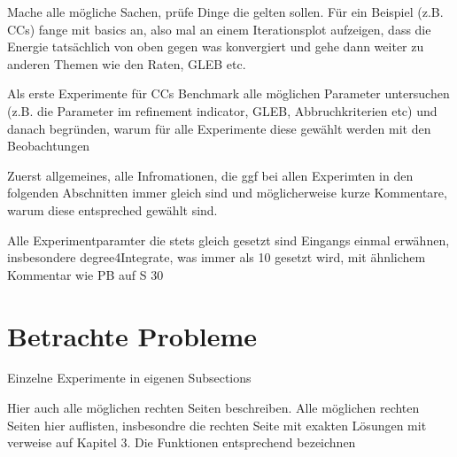 Mache alle mögliche Sachen, prüfe Dinge die gelten sollen. Für ein
Beispiel (z.B. CCs) fange mit basics an, also mal an einem Iterationsplot
aufzeigen, dass die Energie tatsächlich von oben gegen was konvergiert und 
gehe dann weiter zu anderen Themen wie den Raten, GLEB etc.




\bigskip
Als erste Experimente für CCs Benchmark alle möglichen Parameter untersuchen 
(z.B. die Parameter im refinement indicator, GLEB, Abbruchkriterien etc)
und danach begründen, warum für alle Experimente diese gewählt werden mit
den Beobachtungen

\bigskip


Zuerst allgemeines, alle Infromationen, die ggf bei allen Experimten in den 
folgenden Abschnitten immer gleich sind und möglicherweise kurze Kommentare,
warum diese entspreched gewählt sind.

\bigskip

Alle Experimentparamter die stets gleich gesetzt sind Eingangs einmal erwähnen,
insbesondere degree4Integrate, was immer als 10 gesetzt wird, mit ähnlichem 
Kommentar wie PB auf S 30

\section{Betrachte Probleme}
Einzelne Experimente in eigenen Subsections
\bigskip

Hier auch alle möglichen rechten Seiten beschreiben.
Alle möglichen rechten Seiten hier auflisten, insbesondre die rechten 
Seite mit exakten Lösungen mit verweise auf Kapitel 3.
Die Funktionen entsprechend bezeichnen

